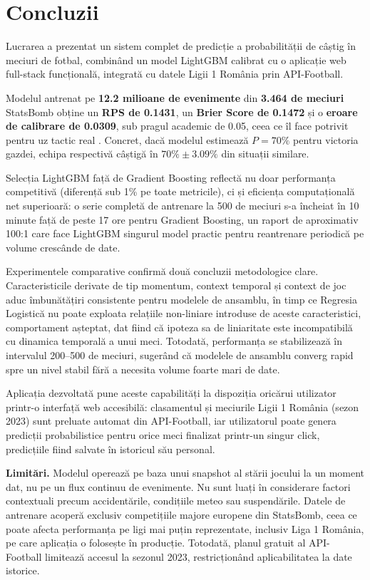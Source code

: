 \chapter*{Concluzii}

Lucrarea a prezentat un sistem complet de predicție a probabilității de câștig 
în meciuri de fotbal, combinând un model LightGBM calibrat cu o aplicație web 
full-stack funcțională, integrată cu datele Ligii 1 România prin API-Football.

Modelul antrenat pe \textbf{12.2 milioane de evenimente} din \textbf{3.464 de 
meciuri} StatsBomb obține un \textbf{RPS de 0.1431}, un \textbf{Brier Score de 
0.1472} și o \textbf{eroare de calibrare de 0.0309}, sub pragul academic de 
0.05, ceea ce îl face potrivit pentru uz tactic real \cite{Robberechts2019}. 
Concret, dacă modelul estimează $P = 70\%$ pentru victoria gazdei, echipa 
respectivă câștigă în $70\% \pm 3.09\%$ din situații similare.

Selecția LightGBM față de Gradient Boosting reflectă nu doar performanța 
competitivă (diferență sub 1\% pe toate metricile), ci și eficiența 
computațională net superioară: o serie completă de antrenare la 500 de meciuri 
s-a încheiat în 10 minute față de peste 17 ore pentru Gradient Boosting, un 
raport de aproximativ 100:1 care face LightGBM singurul model practic pentru 
reantrenare periodică pe volume crescânde de date.

Experimentele comparative confirmă două concluzii metodologice clare. 
Caracteristicile derivate de tip momentum, context temporal și context de joc aduc 
îmbunătățiri consistente pentru modelele de ansamblu, în timp ce Regresia 
Logistică nu poate exploata relațiile non-liniare introduse de aceste 
caracteristici, comportament așteptat, dat fiind că ipoteza sa de liniaritate 
este incompatibilă cu dinamica temporală a unui meci. Totodată, performanța se 
stabilizează în intervalul 200--500 de meciuri, sugerând că modelele de 
ansamblu converg rapid spre un nivel stabil fără a necesita volume foarte mari 
de date.

Aplicația dezvoltată pune aceste capabilități la dispoziția oricărui utilizator 
printr-o interfață web accesibilă: clasamentul și meciurile Ligii 1 România 
(sezon 2023) sunt preluate automat din API-Football, iar utilizatorul poate 
genera predicții probabilistice pentru orice meci finalizat printr-un singur 
click, predicțiile fiind salvate în istoricul său personal.

\textbf{Limitări.} Modelul operează pe baza unui snapshot al stării jocului 
la un moment dat, nu pe un flux continuu de evenimente. Nu sunt luați în 
considerare factori contextuali precum accidentările, condițiile meteo sau 
suspendările. Datele de antrenare acoperă exclusiv competițiile majore europene 
din StatsBomb, ceea ce poate afecta performanța pe ligi mai puțin reprezentate, 
inclusiv Liga 1 România, pe care aplicația o folosește în producție. 
Totodată, planul gratuit al API-Football limitează accesul la sezonul 2023, 
restricționând aplicabilitatea la date istorice.

